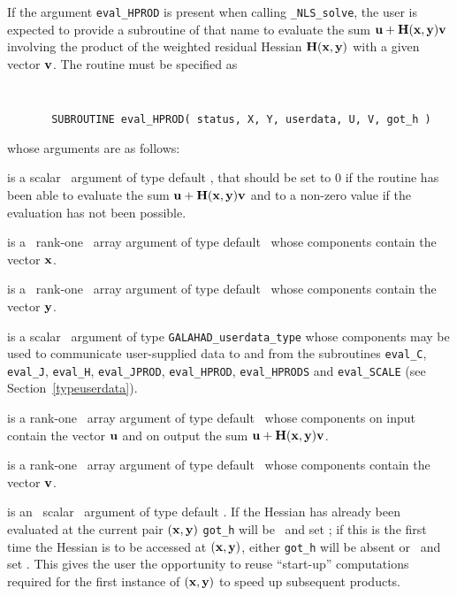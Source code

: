 \documentclass{galahad}
\newcommand{\packagename}{NLS}
\newcommand{\fullpackagename}{\libraryname\_\packagename}
\newcommand{\solver}{{\tt \fullpackagename\_solve}}
\begin{document}
If the argument {\tt eval\_HPROD} is present when calling \solver, the
user is expected to provide a subroutine of that name to evaluate the
sum ${\mathbf{u}} + {\mathbf{H}}({\mathbf{x}},{\mathbf{y}}) {\mathbf{v}}$ involving the
product of the weighted residual Hessian ${\mathbf{H}}({\mathbf{x}},{\mathbf{y}})$
with a given vector ${\mathbf{v}}$.
The routine must be specified as

\def\baselinestretch{0.8}
{\tt
\begin{verbatim}
       SUBROUTINE eval_HPROD( status, X, Y, userdata, U, V, got_h )
\end{verbatim} }
\def\baselinestretch{1.0}
\noindent whose arguments are as follows:

\begin{description}
 is a scalar \intentout\ argument of type default \integer,
that should be set to 0 if the routine has been able to evaluate the
sum ${\mathbf{u}} + {\mathbf{H}}({\mathbf{x}},{\mathbf{y}}){\mathbf{v}}$
and to a non-zero value if the evaluation has not been possible.

 is a \ rank-one \intentin\ array argument of type
default \realdp\ whose components contain the vector ${\mathbf{x}}$.

 is a \ rank-one \intentin\ array argument of type
default \realdp\ whose components contain the vector ${\mathbf{y}}$.

 is a scalar \intentinout\ argument of type
{\tt GALAHAD\_userdata\_type} whose components may be used
to communicate user-supplied data to and from the subroutines
{\tt eval\_C}, {\tt eval\_J}, {\tt eval\_H}, {\tt eval\_JPROD},
{\tt eval\_HPROD}, {\tt eval\_HPRODS} and {\tt eval\_SCALE}
(see Section~\ref{typeuserdata}).

 is a rank-one \intentinout\ array argument of type default \realdp\
whose components on input contain the vector ${\mathbf{u}}$ and on output the
sum ${\mathbf{u}} + {\mathbf{H}}({\mathbf{x}},{\mathbf{y}}) {\mathbf{v}}$.

 is a rank-one \intentin\ array argument of type default \realdp\
whose components contain the vector ${\mathbf{v}}$.

 is an \optional\ scalar \intentin\ argument of type default
\logical. If the Hessian has already been evaluated at the current pair
$({\mathbf{x}},{\mathbf{y}})$
{\tt got\_h} will be \present\ and set \true; if this is the first time
the Hessian is to be accessed at $({\mathbf{x}},{\mathbf{y}})$, either {\tt got\_h} will
be absent or \present\ and set \false. This gives the user the opportunity
to reuse ``start-up'' computations required for the first instance of
$({\mathbf{x}},{\mathbf{y}})$ to speed up subsequent products.

\end{description}
\end{document}
